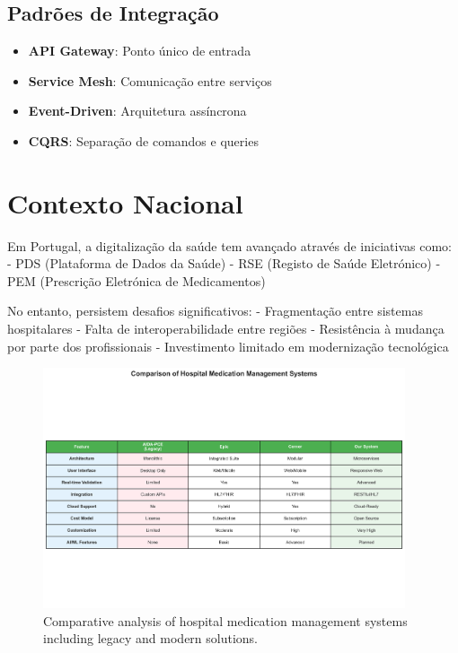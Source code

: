 \subsection{Padrões de Integração}

\begin{itemize}
    \item \textbf{API Gateway}: Ponto único de entrada \cite{newman2021}
    \item \textbf{Service Mesh}: Comunicação entre serviços
    \item \textbf{Event-Driven}: Arquitetura assíncrona \cite{fowler2018}
    \item \textbf{CQRS}: Separação de comandos e queries
\end{itemize}

\section{Contexto Nacional}

Em Portugal, a digitalização da saúde tem avançado através de iniciativas como:
- PDS (Plataforma de Dados da Saúde) \cite{sns2019}
- RSE (Registo de Saúde Eletrónico)
- PEM (Prescrição Eletrónica de Medicamentos) \cite{dgs2020}

No entanto, persistem desafios significativos:
- Fragmentação entre sistemas hospitalares
- Falta de interoperabilidade entre regiões \cite{keasberry2017}
- Resistência à mudança por parte dos profissionais \cite{venkatesh2003}
- Investimento limitado em modernização tecnológica

\begin{figure}[htbp]
    \centering
    \includegraphics[width=0.95\textwidth]{images/generated/system_comparison_table.png}
    \caption{Comparative analysis of hospital medication management systems including legacy and modern solutions.}
    \label{tab:comparison}
\end{figure}


